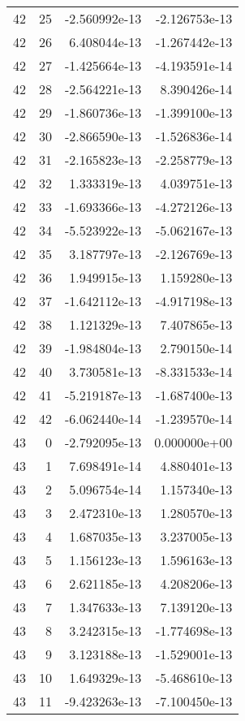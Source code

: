 \begin{tabular}{rrrr}
  42 &   25 & -2.560992e-13 & -2.126753e-13 \\
  42 &   26 &  6.408044e-13 & -1.267442e-13 \\
  42 &   27 & -1.425664e-13 & -4.193591e-14 \\
  42 &   28 & -2.564221e-13 &  8.390426e-14 \\
  42 &   29 & -1.860736e-13 & -1.399100e-13 \\
  42 &   30 & -2.866590e-13 & -1.526836e-14 \\
  42 &   31 & -2.165823e-13 & -2.258779e-13 \\
  42 &   32 &  1.333319e-13 &  4.039751e-13 \\
  42 &   33 & -1.693366e-13 & -4.272126e-13 \\
  42 &   34 & -5.523922e-13 & -5.062167e-13 \\
  42 &   35 &  3.187797e-13 & -2.126769e-13 \\
  42 &   36 &  1.949915e-13 &  1.159280e-13 \\
  42 &   37 & -1.642112e-13 & -4.917198e-13 \\
  42 &   38 &  1.121329e-13 &  7.407865e-13 \\
  42 &   39 & -1.984804e-13 &  2.790150e-14 \\
  42 &   40 &  3.730581e-13 & -8.331533e-14 \\
  42 &   41 & -5.219187e-13 & -1.687400e-13 \\
  42 &   42 & -6.062440e-14 & -1.239570e-14 \\
  43 &    0 & -2.792095e-13 &  0.000000e+00 \\
  43 &    1 &  7.698491e-14 &  4.880401e-13 \\
  43 &    2 &  5.096754e-14 &  1.157340e-13 \\
  43 &    3 &  2.472310e-13 &  1.280570e-13 \\
  43 &    4 &  1.687035e-13 &  3.237005e-13 \\
  43 &    5 &  1.156123e-13 &  1.596163e-13 \\
  43 &    6 &  2.621185e-13 &  4.208206e-13 \\
  43 &    7 &  1.347633e-13 &  7.139120e-13 \\
  43 &    8 &  3.242315e-13 & -1.774698e-13 \\
  43 &    9 &  3.123188e-13 & -1.529001e-13 \\
  43 &   10 &  1.649329e-13 & -5.468610e-13 \\
  43 &   11 & -9.423263e-13 & -7.100450e-13 \\

\end{tabular}
